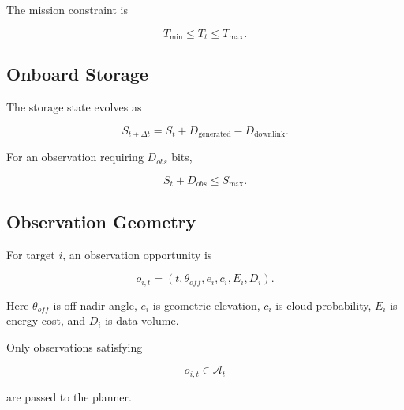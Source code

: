 \documentclass[11pt,a4paper]{article}
\begin{document}
The mission constraint is

\begin{equation}
T_{\min}
\leq
T_t
\leq
T_{\max}.
\end{equation}


\subsection{Onboard Storage}

The storage state evolves as

\begin{equation}
S_{t+\Delta t}
=
S_t
+
D_{\mathrm{generated}}
-
D_{\mathrm{downlink}}.
\end{equation}

For an observation requiring $D_{obs}$ bits,

\begin{equation}
S_t+D_{obs}
\leq
S_{\max}.
\end{equation}


\subsection{Observation Geometry}

For target $i$, an observation opportunity is

\begin{equation}
o_{i,t}
=
(
t,
\theta_{off},
e_i,
c_i,
E_i,
D_i
).
\end{equation}

Here $\theta_{off}$ is off-nadir angle,
$e_i$ is geometric elevation,
$c_i$ is cloud probability,
$E_i$ is energy cost, and
$D_i$ is data volume.

Only observations satisfying

\begin{equation}
o_{i,t}\in\mathcal A_t
\end{equation}

are passed to the planner.

\end{document}
